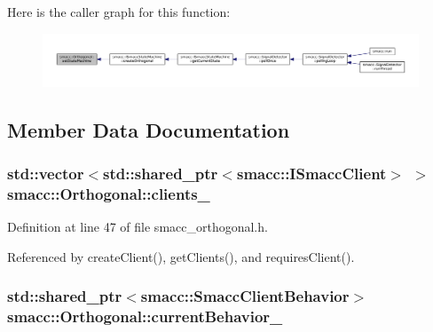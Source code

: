Here is the caller graph for this function\+:
\nopagebreak
\begin{figure}[H]
\begin{center}
\leavevmode
\includegraphics[width=350pt]{classsmacc_1_1Orthogonal_a05f65c01344a6c8593f7f88c0ca19654_icgraph}
\end{center}
\end{figure}




\subsection{Member Data Documentation}
\subsubsection[{\texorpdfstring{clients\+\_\+}{clients_}}]{\setlength{\rightskip}{0pt plus 5cm}std\+::vector$<$std\+::shared\+\_\+ptr$<${\bf smacc\+::\+I\+Smacc\+Client}$>$ $>$ smacc\+::\+Orthogonal\+::clients\+\_\+\hspace{0.3cm}{\ttfamily [private]}}\hypertarget{classsmacc_1_1Orthogonal_a361fd1c4a5b0e6eadd55e919c19969cc}{}\label{classsmacc_1_1Orthogonal_a361fd1c4a5b0e6eadd55e919c19969cc}


Definition at line 47 of file smacc\+\_\+orthogonal.\+h.



Referenced by create\+Client(), get\+Clients(), and requires\+Client().

\subsubsection[{\texorpdfstring{current\+Behavior\+\_\+}{currentBehavior_}}]{\setlength{\rightskip}{0pt plus 5cm}std\+::shared\+\_\+ptr$<${\bf smacc\+::\+Smacc\+Client\+Behavior}$>$ smacc\+::\+Orthogonal\+::current\+Behavior\+\_\+\hspace{0.3cm}{\ttfamily [private]}}\hypertarget{classsmacc_1_1Orthogonal_a8f3139892b590e16e15d92ea65d8e0ca}{}\label{classsmacc_1_1Orthogonal_a8f3139892b590e16e15d92ea65d8e0ca}


